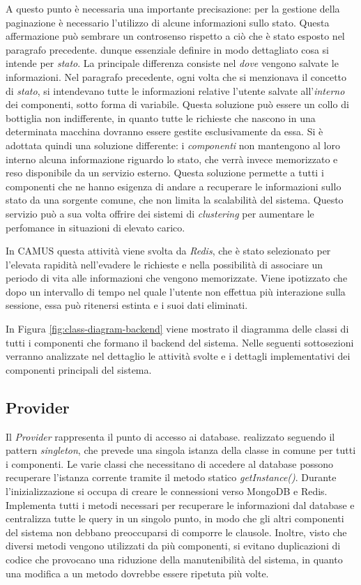 A questo punto è necessaria una importante precisazione: per la gestione della paginazione è necessario l'utilizzo di alcune informazioni sullo stato. Questa affermazione può sembrare un controsenso rispetto a ciò che è stato esposto nel paragrafo precedente. \upe dunque essenziale definire in modo dettagliato cosa si intende per \emph{stato}. La principale differenza consiste nel \emph{dove} vengono salvate le informazioni. Nel paragrafo precedente, ogni volta che si menzionava il concetto di \emph{stato}, si intendevano tutte le informazioni relative l'utente salvate all'\emph{interno} dei componenti, sotto forma di variabile. Questa soluzione può essere un collo di bottiglia non indifferente, in quanto tutte le richieste che nascono in una determinata macchina dovranno essere gestite esclusivamente da essa. Si è adottata quindi una soluzione differente: i \emph{componenti} non mantengono al loro interno alcuna informazione riguardo lo stato, che verrà invece memorizzato e reso disponibile da un servizio esterno. Questa soluzione permette a tutti i componenti che ne hanno esigenza di andare a recuperare le informazioni sullo stato da una sorgente comune, che non limita la scalabilità del sistema. Questo servizio può a sua volta offrire dei sistemi di \emph{clustering} per aumentare le perfomance in situazioni di elevato carico.

In CAMUS questa attività viene svolta da \emph{Redis}, che è stato selezionato per l'elevata rapidità nell'evadere le richieste e nella possibilità di associare un periodo di vita alle informazioni che vengono memorizzate. Viene ipotizzato che dopo un intervallo di tempo nel quale l'utente non effettua più interazione sulla sessione, essa può ritenersi estinta e i suoi dati eliminati.

In Figura \ref{fig:class-diagram-backend} viene mostrato il diagramma delle classi di tutti i componenti che formano il backend del sistema. Nelle seguenti sottosezioni verranno analizzate nel dettaglio le attività svolte e i dettagli implementativi dei componenti principali del sistema.

\subsection{Provider\label{sec:provider}}

Il \emph{Provider} rappresenta il punto di accesso ai database. \upe realizzato seguendo il pattern \emph{singleton}, che prevede una singola istanza della classe in comune per tutti i componenti. Le varie classi che necessitano di accedere al database possono recuperare l'istanza corrente tramite il metodo statico \emph{getInstance()}. Durante l'inizializzazione si occupa di creare le connessioni verso MongoDB e Redis. Implementa tutti i metodi necessari per recuperare le informazioni dal database e centralizza tutte le query in un singolo punto, in modo che gli altri componenti del sistema non debbano preoccuparsi di comporre le clausole. Inoltre, visto che diversi metodi vengono utilizzati da più componenti, si evitano duplicazioni di codice che provocano una riduzione della manutenibilità del sistema, in quanto una modifica a un metodo dovrebbe essere ripetuta più volte.

